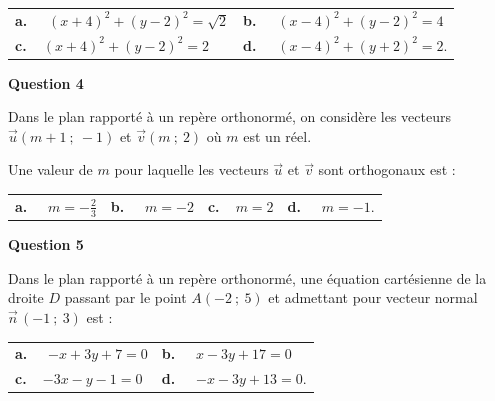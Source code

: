 \documentclass[10pt]{article}
\providecommand{\vv}[1]{\overrightarrow{#1}}
\providecommand{\vv}[1]{{\overrightarrow{#1}}}
\begin{document}
\medskip

\begin{tabularx}{\linewidth}{*{2}{X}}
\textbf{a.~~} $(x+4)^2+(y-2)^2=\sqrt{2} $ &\textbf{b.~~} $(x-4)^2+(y-2)^2=4 $\\\textbf{c.~~}$(x+4)^2+(y-2)^2=2 $& \textbf{d.~~} $(x-4)^2+(y+2)^2=2  $.
\end{tabularx}

\medskip

\textbf{Question 4}

\medskip 

Dans le plan rapporté à un repère orthonormé, on considère les vecteurs $\vv{u}(m+1~;~- 1)$ et $\vv{v}(m~;~2)$ où $m$ est un réel.

Une valeur de $m$ pour laquelle les vecteurs $\vv{u}$ et $\vv{v}$ sont orthogonaux est :

\medskip
\begin{tabularx}{\linewidth}{*{4}{X}}
\textbf{a.~~} $m= -\frac{2}{3}$ &\textbf{b.~~} $m=-2 $&\textbf{c.~~}$m=2 $& \textbf{d.~~} $m=-1  $.
\end{tabularx}

\medskip

\textbf{Question 5}

\medskip 

Dans le plan rapporté à un repère orthonormé, une équation cartésienne de la droite $D$ passant par le point $A(-2~;~5)$ et admettant pour vecteur normal
 $\vv{n}\, (-1~;~3)$ est :

\medskip

\begin{tabularx}{\linewidth}{*{2}{X}}
\textbf{a.~~} $-x + 3y + 7 = 0 $ &\textbf{b.~~} $x-3y + 17 = 0 $\\\textbf{c.~~}$-3x - y - 1 = 0$& \textbf{d.~~} $-x - 3y + 13 = 0  $.
\end{tabularx}

\vspace{0,5cm}
\end{document}
